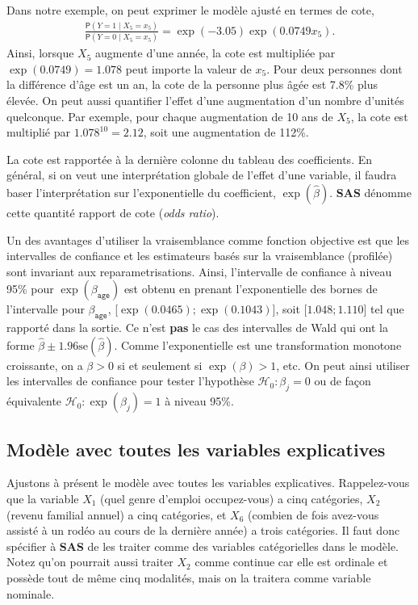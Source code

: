 \documentclass[
  11pt,
  letterpaper,
]{book}
\theoremstyle{definition}
\theoremstyle{definition}
\theoremstyle{definition}
\theoremstyle{definition}
\theoremstyle{remark}
\begin{document}
Dans notre exemple, on peut exprimer le modèle ajusté en termes de cote,
\begin{align*}
 \frac{{\mathsf P}\left(Y=1 \mid X_5=x_5\right)}{{\mathsf P}\left(Y=0 \mid X_5=x_5\right)} = \exp(-3.05)\exp(0.0749x_5).
\end{align*}
Ainsi, lorsque \(X_5\) augmente d'une année, la cote est multipliée par \(\exp(0.0749) = 1.078\) peut importe la valeur de \(x_5\). Pour deux personnes dont la différence d'âge est un an, la cote de la personne plus âgée est 7.8\% plus élevée. On peut aussi quantifier l'effet d'une augmentation d'un nombre d'unités quelconque. Par exemple, pour chaque augmentation de 10 ans de \(X_5\), la cote est multiplié par \(1.078^{10} = 2.12\), soit une augmentation de 112\%.

La cote est rapportée à la dernière colonne du tableau des coefficients. En général, si on veut une interprétation globale de l'effet d'une variable, il faudra baser l'interprétation sur l'exponentielle du coefficient, \(\exp(\widehat{\beta})\). \textbf{SAS} dénomme cette quantité rapport de cote (\emph{odds ratio}).

Un des avantages d'utiliser la vraisemblance comme fonction objective est que les intervalles de confiance et les estimateurs basés sur la vraisemblance (profilée) sont invariant aux reparametrisations. Ainsi, l'intervalle de confiance à niveau 95\% pour \(\exp(\beta_{\texttt{age}})\) est obtenu en prenant l'exponentielle des bornes de l'intervalle pour \(\beta_{\texttt{age}}\), {[}\(\exp(0.0465); \exp(0.1043)\){]}, soit {[}\(1.048; 1.110\){]} tel que rapporté dans la sortie. Ce n'est \textbf{pas} le cas des intervalles de Wald qui ont la forme \(\widehat{\beta} \pm 1.96 \mathrm{se}(\widehat{\beta})\).
Comme l'exponentielle est une transformation monotone croissante, on a \(\beta>0\) si et seulement si \(\exp(\beta)>1\), etc. On peut ainsi utiliser les intervalles de confiance pour tester l'hypothèse \(\mathcal{H}_0: \beta_j=0\) ou de façon équivalente \(\mathcal{H}_0: \exp(\beta_j)=1\) à niveau 95\%.

\hypertarget{moduxe8le-avec-toutes-les-variables-explicatives}{%
\subsection{Modèle avec toutes les variables explicatives}\label{moduxe8le-avec-toutes-les-variables-explicatives}}

Ajustons à présent le modèle avec toutes les variables explicatives. Rappelez-vous que la variable \(X_1\) (quel genre d'emploi occupez-vous) a cinq catégories, \(X_2\) (revenu familial annuel) a cinq catégories, et \(X_6\) (combien de fois avez-vous assisté à un rodéo au cours de la dernière année) a trois catégories. Il faut donc spécifier à \textbf{SAS} de les traiter comme des variables catégorielles dans le modèle. Notez qu'on pourrait aussi traiter \(X_2\) comme continue car elle est ordinale et possède tout de même cinq modalités, mais on la traitera comme variable nominale.
\end{document}
